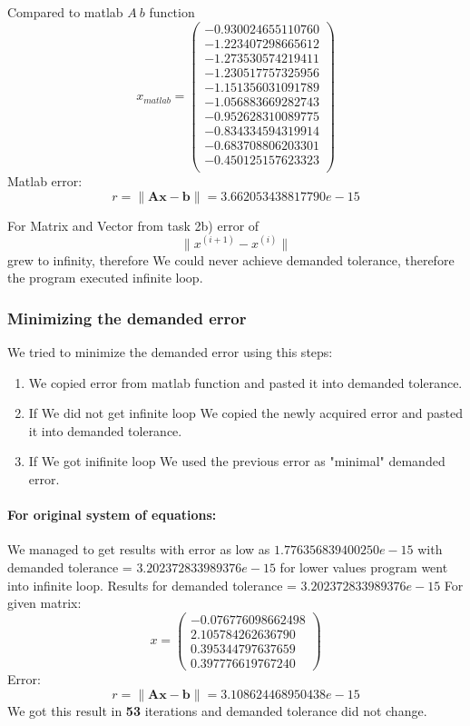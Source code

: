 \documentclass{report}
\begin{document}
Compared to matlab $ A \ b $ function
\[ x_{matlab} = \left( \begin{array}{cc}
  -0.930024655110760 \\
  -1.223407298665612 \\
  -1.273530574219411 \\
  -1.230517757325956 \\
  -1.151356031091789 \\
  -1.056883669282743 \\
  -0.952628310089775 \\
  -0.834334594319914 \\
  -0.683708806203301 \\
  -0.450125157623323 \\
\end{array} \right)
\]
Matlab error:
\[ r = \| \mathbf{A}\mathbf{x} - \mathbf{b}\| = 3.662053438817790e-15 \]

For Matrix and Vector from task 2b) error of
\[ \| x^{(i+1)} - x^{(i)} \| \]
grew to infinity, therefore We could never achieve demanded tolerance, therefore the program executed infinite loop.

\subsubsection{Minimizing the demanded error}
We tried to minimize the demanded error using this steps:
\begin{enumerate}
\item We copied error from matlab function and pasted it into demanded tolerance.
\item If We did not get infinite loop We copied the newly acquired error and pasted it into demanded tolerance.
\item If We got inifinite loop We used the previous error as "minimal" demanded error.
\end{enumerate}
\paragraph{For original system of equations:}
We managed to get results with error as low as $1.776356839400250e-15$ with demanded tolerance = $3.202372833989376e-15$ for lower values program went into infinite loop.
Results for demanded tolerance = $3.202372833989376e-15$
For given matrix:
\[ x = \left( \begin{array}{cc}
  -0.076776098662498 \\
   2.105784262636790 \\
   0.395344797637659 \\
   0.397776619767240
\end{array} \right)
\]
Error:
\[ r = \| \mathbf{A}\mathbf{x} - \mathbf{b}\| = 3.108624468950438e-15 \]
We got this result in \textbf{53} iterations and demanded tolerance did not change.
\end{document}
